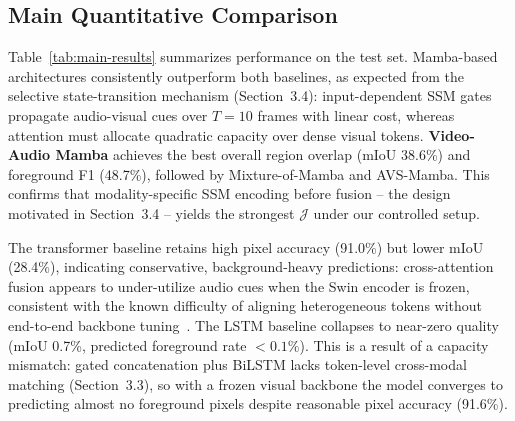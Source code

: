 \documentclass[a4paper,12pt]{extarticle}
\begin{document}
\subsection{Main Quantitative Comparison}

Table~\ref{tab:main-results} summarizes performance on the test set. Mamba-based architectures consistently outperform both baselines, as expected from the selective state-transition mechanism (Section~3.4): input-dependent SSM gates propagate audio-visual cues over $T{=}10$ frames with linear cost, whereas attention must allocate quadratic capacity over dense visual tokens. \textbf{Video-Audio Mamba} achieves the best overall region overlap (mIoU 38.6\%) and foreground F1 (48.7\%), followed by Mixture-of-Mamba and AVS-Mamba. This confirms that modality-specific SSM encoding before fusion -- the design motivated in Section~3.4 -- yields the strongest $\mathcal{J}$ under our controlled setup.

The transformer baseline retains high pixel accuracy (91.0\%) but lower mIoU (28.4\%), indicating conservative, background-heavy predictions: cross-attention fusion appears to under-utilize audio cues when the Swin encoder is frozen, consistent with the known difficulty of aligning heterogeneous tokens without end-to-end backbone tuning~\cite{wang2024refavs}. The LSTM baseline collapses to near-zero quality (mIoU 0.7\%, predicted foreground rate ${<}0.1\%$). This is a result of a capacity mismatch: gated concatenation plus BiLSTM lacks token-level cross-modal matching (Section~3.3), so with a frozen visual backbone the model converges to predicting almost no foreground pixels despite reasonable pixel accuracy (91.6\%).
\end{document}
